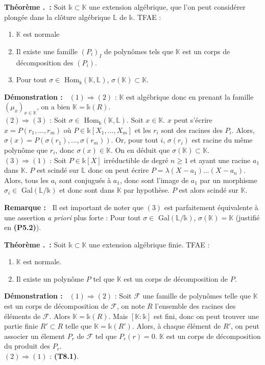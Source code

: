 \documentclass[5pt,a4paper]{article}
\newcounter{thm}[section]
\renewcommand{\thethm}{\thesection.\arabic{thm}}
\newcommand{\thmEnum}[1]{\stepcounter{thm}\noindent\textbf{Théorème \thethm ~:} #1}
\newcommand{\demo}[1]{\textbf{Démonstration :~} #1 \newline}
\newcommand{\rmq}[1]{\textbf{Remarque :~} #1 \newline}
\begin{document}
\begin{onehalfspacing}
\thmEnum{Soit $\mathds{k} \subset \mathbb{K}$ une extension algébrique, que l'on peut considérer plongée dans la clôture algébrique $\mathbb{L}$ de $\mathds{k}$. TFAE :
	\begin{enumerate}
	\item $\mathbb{K}$ est normale
	\item Il existe une famille $(P_i)_I$ de polynômes tels que $\mathbb{K}$ est un corps de décomposition des $(P_i)$.
	\item Pour tout $\sigma \in$ Hom$_\mathds{k}(\mathbb{K},\mathbb{L})$, $\sigma(\mathbb{K}) \subset \mathbb{K}$.
	\end{enumerate}
}
\demo{$(1) \Rightarrow (2)$ : $\mathbb{K}$ est algébrique donc en prenant la famille $(\mu_x)_{x \in \mathbb{K}}$, on a bien $\mathbb{K} = \mathds{k}(R)$.\\
$(2) \Rightarrow (3)$ : Soit $\sigma \in$ Hom$_\mathds{k}(\mathbb{K},\mathbb{L})$. Soit $x \in \mathbb{K}$. $x$ peut s'écrire $x = P(r_1, ..., r_m)$ où $P \in \mathds{k}[X_1, ..., X_m]$ et les $r_i$ sont des racines des $P_i$. Alors, $\sigma(x) = P(\sigma(r_1), ..., \sigma(r_m))$. Or, pour tout $i$, $\sigma(r_i)$ est racine du même polynôme que $r_i$, donc $\sigma(x) \in \mathbb{K}$. On en déduit que $\sigma(\mathbb{K}) \subset \mathbb{K}$.\\
$(3) \Rightarrow (1)$ : Soit $P \in \mathds{k}[X]$ irréductible de degré $n \geq 1$ et ayant une racine $a_1$ dans $\mathbb{K}$. $P$ est scindé sur $\mathbb{L}$ donc on peut écrire $P = \lambda(X - a_1)...(X - a_n)$. Alors, tous les $a_i$ sont conjugués à $a_1$, donc sont l'image de $a_1$ par un morphisme $\sigma_i \in$ Gal$(\mathbb{L}/\mathds{k})$ et donc sont dans $\mathbb{K}$ par hypothèse. $P$ est alors scindé sur $\mathbb{K}$.}


\rmq{Il est important de noter que $(3)$ est parfaitement équivalente à une assertion \textit{a priori} plus forte : Pour tout $\sigma \in $ Gal$(\mathbb{L}/\mathds{k})$, $\sigma(\mathbb{K}) = \mathbb{K}$ (justifié en \textbf{(P5.2)}).}


\thmEnum{Soit $\mathds{k} \subset \mathbb{K}$ une extension algébrique finie. TFAE :
	\begin{enumerate}
	\item $\mathbb{K}$ est normale.
	\item Il existe un polynôme $P$ tel que $\mathbb{K}$ est un corps de décomposition de $P$.
	\end{enumerate}
}
\demo{$(1) \Rightarrow (2)$ : Soit $\mathcal{F}$ une famille de polynômes telle que $\mathbb{K}$ est un corps de décomposition de $\mathcal{F}$, on note $R$ l'ensemble des racines des éléments de $\mathcal{F}$. Alors $\mathbb{K} = \mathds{k}(R)$. Mais $[\mathbb{K} : \mathds{k}]$ est fini, donc on peut trouver une partie finie $R' \subset R$ telle que $\mathbb{K} = \mathds{k}(R')$. Alors, à chaque élément de $R'$, on peut associer un élement $P_r$ de $\mathcal{F}$ tel que $P_r(r) = 0$. $\mathbb{K}$ est un corps de décomposition du produit des $P_r$.\\
$(2) \Rightarrow (1)$ : \textbf{(T8.1)}.}



\end{onehalfspacing}
\end{document}
